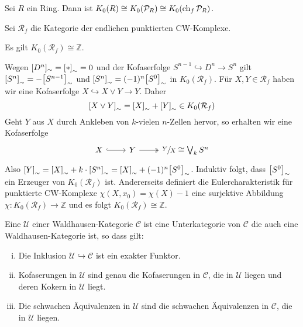 \begin{proposition}
	Sei $R$ ein Ring.
	Dann ist $K_0(R) \cong K_0(\mathcal{P}_R) \cong K_0 (\ch_f \mathcal{P}_R)$.
\end{proposition}

\newpage

\begin{beispiel}
	Sei $\mathcal{R}_f$ die Kategorie der endlichen punktierten CW-Komplexe.
\end{beispiel}

\begin{proposition}
	Es gilt $K_0(\mathcal{R}_f) \cong \mathbb{Z}$.
\end{proposition}
\begin{beweis}
	Wegen $[D^n]_\sim = \benbrace*{*}_\sim =0$ und der Kofaserfolge $S^{n-1} \hookrightarrow D^n \to S^n$ gilt $\benbrace*{S^n}_\sim = - \benbrace*{S^{n-1}}_\sim$ und $\benbrace*{S^n}_\sim = (-1)^n \benbrace*{S^0}_\sim$ in $K_0(\mathcal{R}_f)$.
	Für $X,Y \in \mathcal{R}_f$ haben wir eine Kofaserfolge $X \hookrightarrow X \vee Y \to Y$.
	Daher 
	\[
		\benbrace*{X \vee Y}_\sim = \benbrace*{X}_\sim + \benbrace*{Y}_\sim \in K_0(\mathcal{R}_f)
	\]
	Geht $Y$ aus $X$ durch Ankleben von $k$-vielen $n$-Zellen hervor, so erhalten wir eine Kofaserfolge
	\[
		\begin{tikzcd}
			X \rar[hook] & Y \rar[two heads] & \sfrac{Y}{X} \cong \bigvee_k S^n
		\end{tikzcd}
	\]
	Also $\benbrace*{Y}_\sim = \benbrace*{X}_\sim + k \cdot \benbrace*{S^n}_\sim = \benbrace*{X}_\sim + (-1)^n \benbrace*{S^0}_\sim$.
	Induktiv folgt, dass $\benbrace*{S^0}_\sim$ ein Erzeuger von $K_0(\mathcal{R}_f)$ ist.
	Andererseits definiert die Eulercharakteristik für punktierte CW-Komplexe $\chi(X,x_0) = \chi(X)-1$ eine surjektive Abbildung $\chi \colon K_0(\mathcal{R}_f) \to \mathbb{Z}$ und es folgt $K_0(\mathcal{R}_f) \cong \mathbb{Z}$. 
\end{beweis}

\begin{definition}
	Eine  $\mathcal{U}$ einer Waldhausen-Kategorie $\mathcal{C}$ ist eine Unterkategorie von $\mathcal{C}$ die auch eine Waldhausen-Kategorie ist, so dass gilt:
	\begin{enumerate}[i)]
		\item Die Inklusion $\mathcal{U} \hookrightarrow \mathcal{C}$ ist ein exakter Funktor.
		\item Kofaserungen in $\mathcal{U}$ sind genau die Kofaserungen in $\mathcal{C}$, die in $\mathcal{U}$ liegen und deren Kokern in $\mathcal{U}$ liegt.
		\item Die schwachen Äquivalenzen in $\mathcal{U}$ sind die schwachen Äquivalenzen in $\mathcal{C}$, die in $\mathcal{U}$ liegen.
	\end{enumerate} 
\end{definition}

